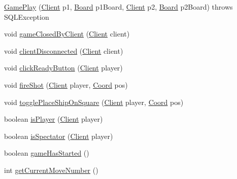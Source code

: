 \begin{DoxyCompactItemize}
\item 
\hyperlink{classpt_1_1up_1_1fe_1_1lpro1613_1_1server_1_1logic_1_1game_1_1_game_play_a9d441d2cde1a58ceeaafdc2785f4b017}{Game\+Play} (\hyperlink{classpt_1_1up_1_1fe_1_1lpro1613_1_1server_1_1conn_1_1_client}{Client} p1, \hyperlink{classpt_1_1up_1_1fe_1_1lpro1613_1_1server_1_1logic_1_1game_1_1_board}{Board} p1\+Board, \hyperlink{classpt_1_1up_1_1fe_1_1lpro1613_1_1server_1_1conn_1_1_client}{Client} p2, \hyperlink{classpt_1_1up_1_1fe_1_1lpro1613_1_1server_1_1logic_1_1game_1_1_board}{Board} p2\+Board)  throws S\+Q\+L\+Exception 
\item 
void \hyperlink{classpt_1_1up_1_1fe_1_1lpro1613_1_1server_1_1logic_1_1game_1_1_game_play_a2456fd5c4981a6e04553bb77b749041c}{game\+Closed\+By\+Client} (\hyperlink{classpt_1_1up_1_1fe_1_1lpro1613_1_1server_1_1conn_1_1_client}{Client} client)
\item 
void \hyperlink{classpt_1_1up_1_1fe_1_1lpro1613_1_1server_1_1logic_1_1game_1_1_game_play_a23edaada7de872711e0cfe61163dec57}{client\+Disconnected} (\hyperlink{classpt_1_1up_1_1fe_1_1lpro1613_1_1server_1_1conn_1_1_client}{Client} client)
\item 
void \hyperlink{classpt_1_1up_1_1fe_1_1lpro1613_1_1server_1_1logic_1_1game_1_1_game_play_ac67b135e1384dfb3baa62ec4837f07fb}{click\+Ready\+Button} (\hyperlink{classpt_1_1up_1_1fe_1_1lpro1613_1_1server_1_1conn_1_1_client}{Client} player)
\item 
void \hyperlink{classpt_1_1up_1_1fe_1_1lpro1613_1_1server_1_1logic_1_1game_1_1_game_play_aa8ed98597766510e3ba9f804c61cded8}{fire\+Shot} (\hyperlink{classpt_1_1up_1_1fe_1_1lpro1613_1_1server_1_1conn_1_1_client}{Client} player, \hyperlink{classpt_1_1up_1_1fe_1_1lpro1613_1_1sharedlib_1_1utils_1_1_coord}{Coord} pos)
\item 
void \hyperlink{classpt_1_1up_1_1fe_1_1lpro1613_1_1server_1_1logic_1_1game_1_1_game_play_a6fcb90a31171ecfc5a9ed4f41b2396ee}{toggle\+Place\+Ship\+On\+Square} (\hyperlink{classpt_1_1up_1_1fe_1_1lpro1613_1_1server_1_1conn_1_1_client}{Client} player, \hyperlink{classpt_1_1up_1_1fe_1_1lpro1613_1_1sharedlib_1_1utils_1_1_coord}{Coord} pos)
\item 
boolean \hyperlink{classpt_1_1up_1_1fe_1_1lpro1613_1_1server_1_1logic_1_1game_1_1_game_play_a64af21d57da05af1d37d17ea71109aa7}{is\+Player} (\hyperlink{classpt_1_1up_1_1fe_1_1lpro1613_1_1server_1_1conn_1_1_client}{Client} player)
\item 
boolean \hyperlink{classpt_1_1up_1_1fe_1_1lpro1613_1_1server_1_1logic_1_1game_1_1_game_play_ac5e55275f14fd2a9cf8f430a14cf9b6e}{is\+Spectator} (\hyperlink{classpt_1_1up_1_1fe_1_1lpro1613_1_1server_1_1conn_1_1_client}{Client} player)
\item 
boolean \hyperlink{classpt_1_1up_1_1fe_1_1lpro1613_1_1server_1_1logic_1_1game_1_1_game_play_add9e9aabd2a8cc2a7292c07da1f78633}{game\+Has\+Started} ()
\item 
int \hyperlink{classpt_1_1up_1_1fe_1_1lpro1613_1_1server_1_1logic_1_1game_1_1_game_play_a11a46b9f496810e0d145462ffd23843b}{get\+Current\+Move\+Number} ()
\end{DoxyCompactItemize}
